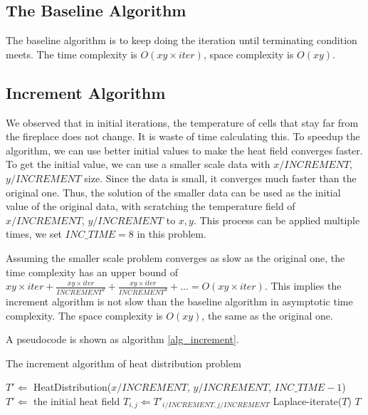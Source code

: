\documentclass{acm_proc_article-sp}
\begin{document}
\subsection{The Baseline Algorithm}

The baseline algorithm is to keep doing the iteration until terminating condition meets. The time complexity is $O(xy\times iter)$, space complexity is $O(xy)$.

\subsection{Increment Algorithm}

We observed that in initial iterations, the temperature of cells that stay far from the fireplace does not change. It is waste of time calculating this. To speedup the algorithm, we can use better initial values to make the heat field converges faster. To get the initial value, we can use a smaller scale data with $x/INCREMENT$, $y/INCREMENT$ size. Since the data is small, it converges much faster than the original one. Thus, the solution of the smaller data can be used as the initial value of the original data, with scratching the temperature field of $x/INCREMENT$, $y/INCREMENT$ to $x, y$. This process can be applied multiple times, we set $INC\_TIME=8$ in this problem.

Assuming the smaller scale problem converges as slow as the original one, the time complexity has an upper bound of $xy\times iter + \frac{xy\times iter}{INCREMENT^2} + \frac{xy\times iter}{INCREMENT^4} + ... = O(xy\times iter)$. This implies the increment algorithm is not slow than the baseline algorithm in asymptotic time complexity. The space complexity is $O(xy)$, the same as the original one.

A pseudocode is shown as algorithm \ref{alg_increment}.

\begin{algorithm}                     
\caption{The increment algorithm of heat distribution problem}        
\label{alg_increment}                         
\begin{algorithmic}
			\State $T' \Leftarrow$ HeatDistribution($x/INCREMENT$, $y/INCREMENT$, $INC\_TIME-1$)
		\Else
			\State $T' \Leftarrow$ the initial heat field
		\EndIf
 				\State $T_{i,j} \Leftarrow T'_{i/INCREMENT, j/INCREMENT}$
 			\EndFor
 		\EndFor
 			\State Laplace-iterate($T$)
 		\EndWhile
 		\Return $T$
    \EndFunction
\end{algorithmic}
\end{algorithm}
\end{document}
